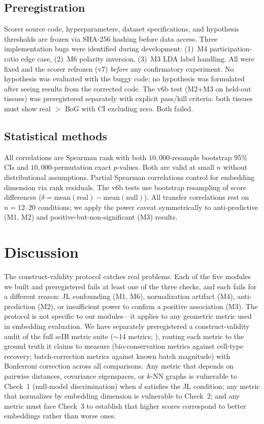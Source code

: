 \documentclass[9pt,lineno]{elife}
\begin{document}
\subsection{Preregistration}

Scorer source code, hyperparameters, dataset specifications, and hypothesis thresholds are frozen via SHA-256 hashing before data access. Three implementation bugs were identified during development: (1)~M4 participation-ratio edge case, (2)~M6 polarity inversion, (3)~M3 LDA label handling. All were fixed and the scorer refrozen (v7) \emph{before} any confirmatory experiment. No hypothesis was evaluated with the buggy code; no hypothesis was formulated after seeing results from the corrected code. The v6b test (M2+M3 on held-out tissues) was preregistered separately with explicit pass/kill criteria: both tissues must show real $>$ BoG with CI excluding zero. Both failed.

\subsection{Statistical methods}

All correlations are Spearman rank with both $10{,}000$-resample bootstrap 95\% CIs and $10{,}000$-permutation exact $p$-values. Both are valid at small $n$ without distributional assumptions. Partial Spearman correlations control for embedding dimension via rank residuals. The v6b tests use bootstrap resampling of score differences ($\delta = \text{mean}(\text{real}) - \text{mean}(\text{null})$). All transfer correlations rest on $n = 12$--$20$ conditions; we apply the power caveat symmetrically to anti-predictive (M1, M2) and positive-but-non-significant (M3) results.


\section{Discussion}

The construct-validity protocol catches real problems. Each of the five modules we built and preregistered fails at least one of the three checks, and each fails for a different reason: JL confounding (M1, M6), normalization artifact (M4), anti-prediction (M2), or insufficient power to confirm a positive association (M3). The protocol is not specific to our modules---it applies to any geometric metric used in embedding evaluation. We have separately preregistered a construct-validity audit of the full scIB metric suite ($\sim$14 metrics; \citealp{luecken2022scib}), routing each metric to the ground truth it claims to measure (bio-conservation metrics against cell-type recovery; batch-correction metrics against known batch magnitude) with Bonferroni correction across all comparisons. Any metric that depends on pairwise distances, covariance eigenspaces, or $k$-NN graphs is vulnerable to Check~1 (null-model discrimination) when $d$ satisfies the JL condition; any metric that normalizes by embedding dimension is vulnerable to Check~2; and any metric must face Check~3 to establish that higher scores correspond to better embeddings rather than worse ones.
\end{document}
